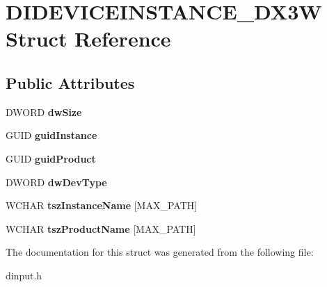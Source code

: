 \hypertarget{struct_d_i_d_e_v_i_c_e_i_n_s_t_a_n_c_e___d_x3_w}{\section{D\-I\-D\-E\-V\-I\-C\-E\-I\-N\-S\-T\-A\-N\-C\-E\-\_\-\-D\-X3\-W Struct Reference}
\label{struct_d_i_d_e_v_i_c_e_i_n_s_t_a_n_c_e___d_x3_w}
}
\subsection*{Public Attributes}
\begin{DoxyCompactItemize}
\item 
\hypertarget{struct_d_i_d_e_v_i_c_e_i_n_s_t_a_n_c_e___d_x3_w_a496ff115e090892f909f809328e9463b}{D\-W\-O\-R\-D {\bfseries dw\-Size}}\label{struct_d_i_d_e_v_i_c_e_i_n_s_t_a_n_c_e___d_x3_w_a496ff115e090892f909f809328e9463b}

\item 
\hypertarget{struct_d_i_d_e_v_i_c_e_i_n_s_t_a_n_c_e___d_x3_w_a0bd5723893b29b38dcd6de869c8b793c}{G\-U\-I\-D {\bfseries guid\-Instance}}\label{struct_d_i_d_e_v_i_c_e_i_n_s_t_a_n_c_e___d_x3_w_a0bd5723893b29b38dcd6de869c8b793c}

\item 
\hypertarget{struct_d_i_d_e_v_i_c_e_i_n_s_t_a_n_c_e___d_x3_w_a200f769ab9387fdd9e29a5e09bc7fe29}{G\-U\-I\-D {\bfseries guid\-Product}}\label{struct_d_i_d_e_v_i_c_e_i_n_s_t_a_n_c_e___d_x3_w_a200f769ab9387fdd9e29a5e09bc7fe29}

\item 
\hypertarget{struct_d_i_d_e_v_i_c_e_i_n_s_t_a_n_c_e___d_x3_w_afe081f0188f6d9a36a9d7645c5803326}{D\-W\-O\-R\-D {\bfseries dw\-Dev\-Type}}\label{struct_d_i_d_e_v_i_c_e_i_n_s_t_a_n_c_e___d_x3_w_afe081f0188f6d9a36a9d7645c5803326}

\item 
\hypertarget{struct_d_i_d_e_v_i_c_e_i_n_s_t_a_n_c_e___d_x3_w_a488068bcea4b2998769e1b9670c4fbbd}{W\-C\-H\-A\-R {\bfseries tsz\-Instance\-Name} \mbox{[}M\-A\-X\-\_\-\-P\-A\-T\-H\mbox{]}}\label{struct_d_i_d_e_v_i_c_e_i_n_s_t_a_n_c_e___d_x3_w_a488068bcea4b2998769e1b9670c4fbbd}

\item 
\hypertarget{struct_d_i_d_e_v_i_c_e_i_n_s_t_a_n_c_e___d_x3_w_a5591863134fef848106d4b8e27d562a3}{W\-C\-H\-A\-R {\bfseries tsz\-Product\-Name} \mbox{[}M\-A\-X\-\_\-\-P\-A\-T\-H\mbox{]}}\label{struct_d_i_d_e_v_i_c_e_i_n_s_t_a_n_c_e___d_x3_w_a5591863134fef848106d4b8e27d562a3}

\end{DoxyCompactItemize}


The documentation for this struct was generated from the following file\-:\begin{DoxyCompactItemize}
\item 
dinput.\-h\end{DoxyCompactItemize}
